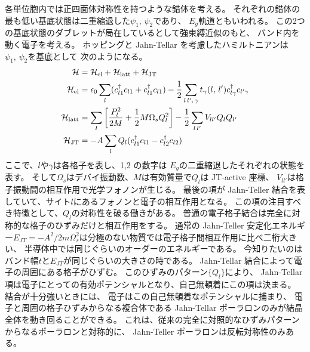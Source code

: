 \documentclass[11pt,dvipdfmx,a4paper]{jsarticle}
\begin{document}
各単位胞内では正四面体対称性を持つような錯体を考える。
それぞれの錯体の最も低い基底状態は二重縮退した\(\psi_1,\,\psi_2\)であり、
\(E_g\)軌道ともいわれる。
この2つの基底状態のダブレットが局在しているとして強束縛近似のもと、
バンド内を動く電子を考える。
ホッピングと Jahn-Tellar を考慮したハミルトニアンは\(\psi_1,\,\psi_2\)を基底として
次のようになる。
\begin{align}
    \mathcal{H} &= \mathcal{H}_\text{el} + \mathcal{H}_\text{latt} + \mathcal{H}_\text{JT}\\
    \mathcal{H}_\text{el} &= \epsilon_0 \sum_l (c_{l1}^{\dagger}c_{l1}+c_{l1}^{\dagger}c_{l1})-\frac{1}{2}\sum_{l\,l',\,\gamma}t_\gamma(l,\,l')c_{l\gamma}^{\dagger}c_{l'\gamma}\\
    \mathcal{H}_\text{latt} &= \sum_l \qty[\frac{P_l^2}{2M}+\frac{1}{2}M\Omega_s Q_l^2]-\frac{1}{2}\sum_{l\,l'} V_{ll'}Q_lQ_{l'}\\
    \mathcal{H}_\text{JT} &= -A\sum_l Q_l(c_{l1}^{\dagger}c_{l1}-c_{l2}^{\dagger}c_{l2})
\end{align}
ここで、\(l\)や\(\gamma\)は各格子を表し、1,2 の数字は \(E_g\)の二重縮退したそれぞれの状態を表す。
そして\(\Omega_s\)はデバイ振動数、\(M\)は有効質量で\(Q_l\)は JT-active 座標、
 \(V_{ll'}\)は格子振動間の相互作用で光学フォノンが生じる。
最後の項が Jahn-Teller 結合を表していて、サイト\(l\)にあるフォノンと電子の相互作用となる。
この項の注目すべき特徴として、\(Q_l\)の対称性を破る働きがある。
普通の電子格子結合は完全に対称的な格子のひずみだけと相互作用をする。
通常の Jahn-Teller 安定化エネルギー\(E_{JT}=-A^2/2m\Omega_s^2\)は分極のない物質では電子格子間相互作用に比べ二桁大きい、
半導体中では同じぐらいのオーダーのエネルギーである。
今知りたいのはバンド幅\(t\)と\(E_{JT}\)が同じぐらいの大きさの時である。
Jahn-Tellar 結合によって電子の周囲にある格子がひずむ。
このひずみのパターン\(\{Q_l\}\)により、
Jahn-Tellar 項は電子にとっての有効ポテンシャルとなり、自己無頓着にこの項は決まる。
結合が十分強いときには、
電子はこの自己無頓着なポテンシャルに捕まり、
電子と周囲の格子ひずみからなる複合体である Jahn-Tellar ポーラロンのみが結晶全体を動き回ることができる。
これは、従来の完全に対照的なひずみパターンからなるポーラロンと対称的に、
Jahn-Teller ポーラロンは反転対称性のみある。
\end{document}
